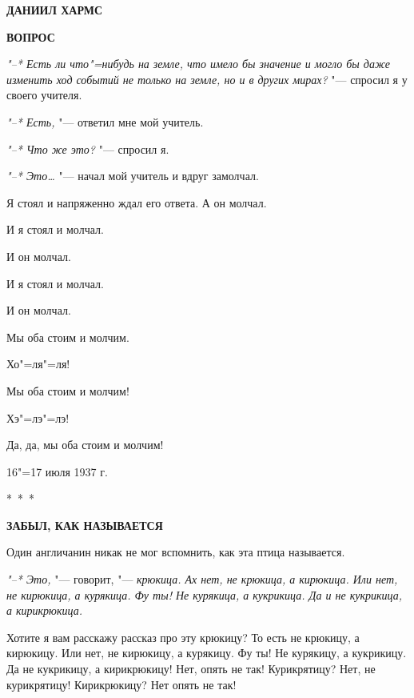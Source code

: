 \documentclass[12pt]{extarticle}
\begin{document}
\thispagestyle{empty}

\begin{center}
\Huge\bf
ДАНИИЛ ХАРМС

\vspace{1.5cm}
\large\bf
ВОПРОС
\end{center}

\vspace{0.15cm}
\rm
\textit{"--* Есть ли что"=нибудь на земле, что  имело 
бы значение и  могло бы даже изменить ход
событий не только на земле,  но  и  в других
мирах?} "--- спросил я у своего учителя.

\textit{"--* Есть,} "--- ответил мне мой учитель.

\textit{"--* Что же это?} "--- спросил я.

\textit{"--* Это\dots} "--- начал мой учитель и вдруг 
замолчал.


Я стоял и напряженно  ждал его ответа. А
он молчал.
    
И я стоял и молчал.
    
И он молчал.
    
И я стоял и молчал.
    
И он молчал.
    
Мы оба стоим и молчим.
    
Хо"=ля"=ля!
    
Мы оба стоим и молчим!
    
Хэ"=лэ"=лэ!
    
Да, да, мы оба стоим и молчим!

\begin{flushright}
16"=17 июля 1937 г.
\end{flushright}

\begin{center}
\vspace{0.1cm}
\large
*~*~*

\vspace{0.3cm}
\bf
ЗАБЫЛ, КАК НАЗЫВАЕТСЯ
\end{center}

\rm

Один англичанин никак не  мог вспомнить,
как эта птица называется.

\textit{"--* Это,} "--- говорит, "--- \textit{крюкица.  Ах нет, не
крюкица, а кирюкица.  Или нет,  не кирюкица,
а курякица. Фу ты! Не курякица, а кукрикица.
Да и не кукрикица, а кирикрюкица.}
    
Хотите  я вам расскажу  рассказ  про эту
крюкицу? То есть не крюкицу, а кирюкицу. Или
нет, не кирюкицу, а курякицу. Фу ты!  Не курякицу, 
а кукрикицу. Да не  кукрикицу, а кирикрюкицу!  
Нет, опять не так!  Курикрятицу?
Нет, не курикрятицу!  Кирикрюкицу? Нет опять
не так!
    
\end{document}
